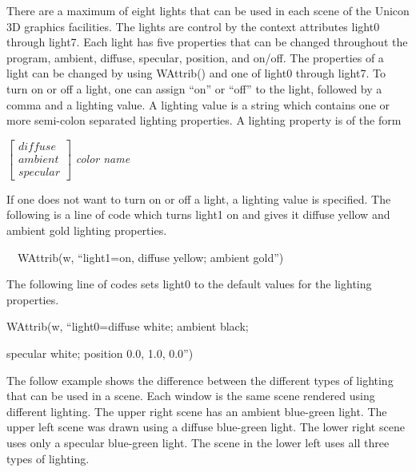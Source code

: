\documentclass[letterpaper]{article}
\begin{document}
{
There are a maximum of eight lights that can be used in each scene of the Unicon 3D graphics facilities. The lights are
control by the context attributes \textsf{light0} through \textsf{light7}. Each light has five properties that can be
changed throughout the program, ambient, diffuse, specular, position, and on/off. The properties of a light can be
changed by using \textsf{WAttrib()} and one of \textsf{light0} through \textsf{light7}. To turn on or off a light,
one can assign \textsf{{}``on''} or \textsf{{}``off''} to the light, followed by a comma and a lighting value.
A lighting value is a string which contains one or more semi-colon separated lighting properties. A lighting property
is of the form

\bigskip

$\left[
\begin{array}{l}
diffuse\\ambient\\specular
\end{array}
\right]$ \textsf{\textit{color name}}

\bigskip

If one does not want to turn on or off a light, a lighting value is
specified. The following is a line of code which turns \textsf{light1}
on and gives it diffuse yellow and ambient gold lighting properties.

\bigskip

{
\ \ \textsf{WAttrib(w, ``light1=on, diffuse yellow; ambient gold'')}}

\bigskip

The following line of codes sets \textsf{light0} to the
default values for the lighting properties.

\bigskip

{\sffamily
WAttrib(w, ``light0=diffuse white; ambient black;}

{\sffamily
specular white; position 0.0, 1.0, 0.0'')}


\bigskip

The follow example shows the difference between the different types of
lighting that can be used in a scene. Each window is the same scene
rendered using different lighting. The upper right scene has an ambient
blue-green light. The upper left scene was drawn using a diffuse
blue-green light. The lower right scene uses only a specular blue-green
light. The scene in the lower left uses all three types of lighting.


\bigskip

}
\end{document}
